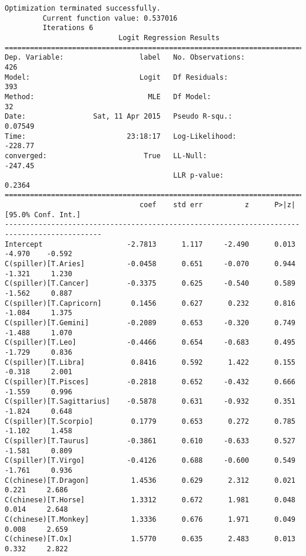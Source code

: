 \documentclass[12pt,fleqn]{article}\usepackage{../common}
\begin{document}
\begin{verbatim}
Optimization terminated successfully.
         Current function value: 0.537016
         Iterations 6
                           Logit Regression Results                           
==============================================================================
Dep. Variable:                  label   No. Observations:                  426
Model:                          Logit   Df Residuals:                      393
Method:                           MLE   Df Model:                           32
Date:                Sat, 11 Apr 2015   Pseudo R-squ.:                 0.07549
Time:                        23:18:17   Log-Likelihood:                -228.77
converged:                       True   LL-Null:                       -247.45
                                        LLR p-value:                    0.2364
=============================================================================================
                                coef    std err          z      P>|z|      [95.0% Conf. Int.]
---------------------------------------------------------------------------------------------
Intercept                    -2.7813      1.117     -2.490      0.013        -4.970    -0.592
C(spiller)[T.Aries]          -0.0458      0.651     -0.070      0.944        -1.321     1.230
C(spiller)[T.Cancer]         -0.3375      0.625     -0.540      0.589        -1.562     0.887
C(spiller)[T.Capricorn]       0.1456      0.627      0.232      0.816        -1.084     1.375
C(spiller)[T.Gemini]         -0.2089      0.653     -0.320      0.749        -1.488     1.070
C(spiller)[T.Leo]            -0.4466      0.654     -0.683      0.495        -1.729     0.836
C(spiller)[T.Libra]           0.8416      0.592      1.422      0.155        -0.318     2.001
C(spiller)[T.Pisces]         -0.2818      0.652     -0.432      0.666        -1.559     0.996
C(spiller)[T.Sagittarius]    -0.5878      0.631     -0.932      0.351        -1.824     0.648
C(spiller)[T.Scorpio]         0.1779      0.653      0.272      0.785        -1.102     1.458
C(spiller)[T.Taurus]         -0.3861      0.610     -0.633      0.527        -1.581     0.809
C(spiller)[T.Virgo]          -0.4126      0.688     -0.600      0.549        -1.761     0.936
C(chinese)[T.Dragon]          1.4536      0.629      2.312      0.021         0.221     2.686
C(chinese)[T.Horse]           1.3312      0.672      1.981      0.048         0.014     2.648
C(chinese)[T.Monkey]          1.3336      0.676      1.971      0.049         0.008     2.659
C(chinese)[T.Ox]              1.5770      0.635      2.483      0.013         0.332     2.822

\end{verbatim}
\end{document}
